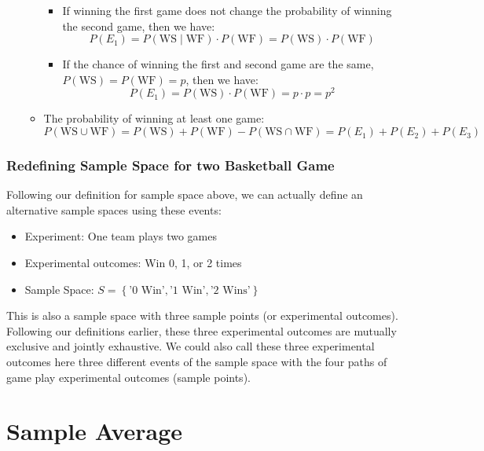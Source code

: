 \documentclass[
]{book}
\providecommand{\tightlist}{%
  \setlength{\itemsep}{0pt}\setlength{\parskip}{0pt}}
\begin{document}
\begin{itemize}
\begin{itemize}
    \begin{itemize}
    \tightlist
    \item
      If winning the first game does not change the probability of winning the second game, then we have:
      \[P(E_1) = P(\text{WS} \mid \text{WF}) \cdot P(\text{WF}) = P(\text{WS}) \cdot P(\text{WF}) \]
    \item
      If the chance of winning the first and second game are the same, \(P(\text{WS})=P(\text{WF})=p\), then we have:
      \[P(E_1) = P(\text{WS}) \cdot P(\text{WF}) = p \cdot p = p^2 \]
    \end{itemize}
  \item
    The probability of winning at least one game:
    \[P(\text{WS} \cup \text{WF}) = P(\text{WS}) +  P(\text{WF}) - P(\text{WS} \cap \text{WF}) = P(E_1) + P(E_2) + P(E_3) \]
  \end{itemize}
\end{itemize}

\hypertarget{redefining-sample-space-for-two-basketball-game}{%
\subsubsection{Redefining Sample Space for two Basketball Game}\label{redefining-sample-space-for-two-basketball-game}}

Following our definition for sample space above, we can actually define an alternative sample spaces using these events:

\begin{itemize}
\tightlist
\item
  Experiment: One team plays two games
\item
  Experimental outcomes: Win 0, 1, or 2 times
\item
  Sample Space: \(S=\left\{\text{'0 Win'}, \text{'1 Win'}, \text{'2 Wins'}\right\}\)
\end{itemize}

This is also a sample space with three sample points (or experimental outcomes). Following our definitions earlier, these three experimental outcomes are mutually exclusive and jointly exhaustive. We could also call these three experimental outcomes here three different events of the sample space with the four paths of game play experimental outcomes (sample points).

\hypertarget{sample-average}{%
\section{Sample Average}\label{sample-average}}
\end{document}
